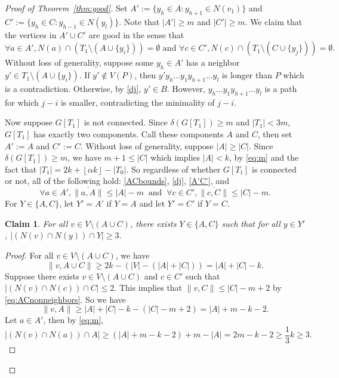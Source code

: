 \documentclass[oneside,12pt]{memoir}
\newtheorem{claim}[theorem]{Claim}
\newcommand{\floor}[1]{\left\lfloor#1\right\rfloor}
\begin{document}
\begin{proof}[Proof of Theorem~\ref{thm:good}]
Set $A':=\{y_h\in A:y_{h+1}\in N(v_1)\}$ and $C':=\{y_h\in C: y_{h-1}\in N(y_l)\}$.  Note that $|A'|\geq m$ and $|C'|\geq m$.  
We claim that the vertices in $A'\cup C'$ are good in the sense that
\begin{equation}\label{A'C'}
\forall a\in A', N(a)\cap (T_1\setminus (A\cup \{y_i\}))= \emptyset \text{ and }  \forall c\in C', N(c)\cap (T_1\setminus (C\cup \{y_j\}))= \emptyset.                                                                                                                                                                                                                                                                                                                                                                                            \end{equation}
Without loss of generality, suppose some $y_h\in A'$ has a neighbor $y'\in T_1\setminus (A\cup \{y_i\})$.  %
If $y'\notin V(P)$, then $y'y_h\dots y_1y_{h+1}\dots y_l$ is longer than $P$ which is a contradiction.  Otherwise, by \eqref{dj}, $y'\in B$.  However, $y_h\dots y_1y_{h+1}\dots y_l$ is a path for which $j-i$ is smaller, contradicting the minimality of $j-i$.

Now suppose $G[T_1]$ is not connected.  Since $\delta(G[T_1])\geq m$ and $|T_1|< 3m$, $G[T_1]$ has exactly two components.  Call these components $A$ and $C$, then set $A':=A$ and $C':=C$.  Without loss of generality, suppose $|A|\geq |C|$.  Since $\delta(G[T_1])\geq m$, we have $m+1\leq |C|$ which implies $|A|<k$, by \eqref{eq:m} and the fact that $|T_1|=2k+\floor{\alpha k}-|T_0|$.  So regardless of whether $G[T_1]$ is connected or not, all of the following hold: \eqref{ACbounds}, \eqref{dj}, \eqref{A'C'}, and  \begin{equation}\label{eq:ACnonneighbors} \forall a\in A', \overline{\|a, A\|}\leq|A|-m 
~\text{ and }~ \forall c\in C', \overline{\|c, C\|}\leq|C|-m.\end{equation}
For $Y\in\{A, C\}$, let $Y'=A'$ if $Y=A$ and let $Y'=C'$ if $Y=C$.
\begin{claim}\label{Y'}
For all $v\in V\setminus (A\cup C)$, there exists $Y\in\{A, C\}$ such that for all $y\in Y'$, $|(N(v)\cap N(y))\cap Y|\geq 3$.
\end{claim}

\begin{proof}
For all $v\in V\setminus (A\cup C)$, we have 
\begin{equation}
\|v, A\cup C\|\geq 2k-(|V|-(|A|+|C|))=|A|+|C|-k.
\end{equation}
Suppose there exists $v\in V\setminus (A\cup C)$ and $c\in C'$ such that $|(N(v)\cap N(c))\cap C|\leq 2$.  This implies that $\|v, C\|\leq |C|-m+2$ by \eqref{eq:ACnonneighbors}.  So we have $$\|v, A\|\geq |A|+|C|-k-(|C|-m+2)= |A|+m-k-2.$$  Let $a\in A'$, then by \eqref{eq:m}, $$|(N(v)\cap N(a))\cap A|\geq (|A|+m-k-2)+m-|A|= 2m-k-2\geq \frac{1}{3}k\geq 3.$$


\end{proof}
\end{proof}
\end{document}
